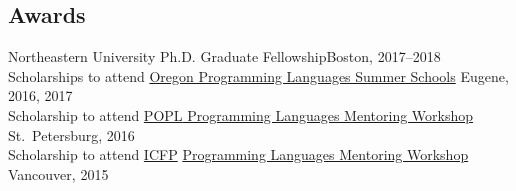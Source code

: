 \documentclass[margin,line]{resume}
\begin{document}
\begin{resume}
    

    \renewcommand\mymedskip{3pt}




    \section{\mysidestyle Awards} 

    Northeastern University Ph.D. Graduate Fellowship\hfill Boston, 2017--2018\\[\mymedskip]
    Scholarships to attend
    \href{https://www.cs.uoregon.edu/research/summerschool/summer17}
    {Oregon Programming Languages Summer Schools} \hfill %
    Eugene, 2016, 2017\\[\mymedskip]
    Scholarship to attend 
     \href{http://conf.researchr.org/home/PLMW-2016}{{\small POPL}
        Programming Languages Mentoring Workshop} \hfill St.~Petersburg, 2016\\[\mymedskip]
            Scholarship to attend
           \href{http://icfpconference.org/icfp2015/}{{\small ICFP}}
           \href{https://www.cis.upenn.edu/~sweirich/icfp-plmw15/}
                {Programming Languages Mentoring Workshop}
\hfill         Vancouver, %
2015



\end{resume}
\end{document}
